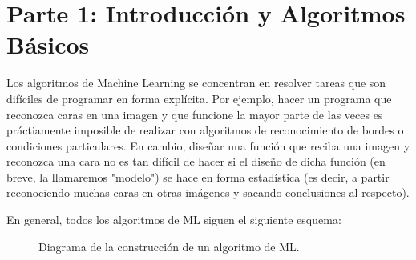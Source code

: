 \section{Parte 1: Introducción y Algoritmos Básicos}

Los algoritmos de Machine Learning se concentran en resolver tareas que son difíciles de programar en forma explícita. Por ejemplo, hacer un programa que reconozca caras en una imagen y que funcione la mayor parte de las veces es práctiamente imposible de realizar con algoritmos de reconocimiento de bordes o condiciones particulares. En cambio, diseñar una función que reciba una imagen y reconozca una cara no es tan difícil de hacer si el diseño de dicha función (en breve, la llamaremos "modelo") se hace en forma estadística (es decir, a partir reconociendo muchas caras en otras imágenes y sacando conclusiones al respecto). 

En general, todos los algoritmos de ML siguen el siguiente esquema:
\begin{figure}[h!]
\centering
\caption{Diagrama de la construcción de un algoritmo de ML.}
\end{figure}
